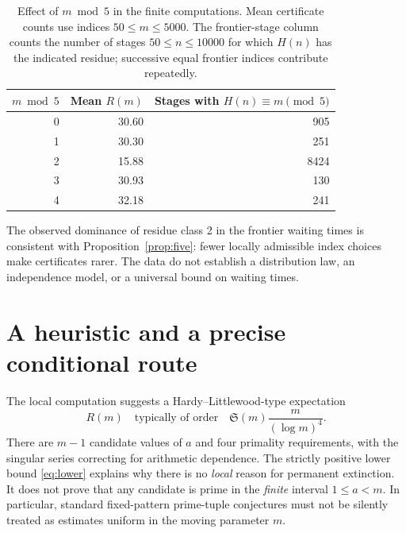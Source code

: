 \documentclass[11pt,a4paper]{article}
\numberwithin{equation}{section}
\theoremstyle{definition}
\newcommand{\SM}{\mathfrak{S}}
\begin{document}
\begin{table}[ht]
\centering
\caption{Effect of \(m\bmod5\) in the finite computations. Mean certificate counts use indices \(50\le m\le5000\). The frontier-stage column counts the number of stages \(50\le n\le10000\) for which \(H(n)\) has the indicated residue; successive equal frontier indices contribute repeatedly.}
\label{tab:five}
\begin{tabular}{rrr}
\toprule
\(m\bmod5\)&Mean \(R(m)\)&Stages with \(H(n)\equiv m\pmod5\)\\
\midrule
0&30.60&905\\
1&30.30&251\\
2&15.88&8424\\
3&30.93&130\\
4&32.18&241\\
\bottomrule
\end{tabular}
\end{table}

The observed dominance of residue class 2 in the frontier waiting times is consistent with Proposition~\ref{prop:five}: fewer locally admissible index choices make certificates rarer. The data do not establish a distribution law, an independence model, or a universal bound on waiting times.

\section{A heuristic and a precise conditional route}
The local computation suggests a Hardy--Littlewood-type expectation
\begin{equation}\label{eq:heuristic}
R(m)\quad\text{typically of order}\quad
\SM(m)\frac{m}{(\log m)^4}.
\end{equation}
There are \(m-1\) candidate values of \(a\) and four primality requirements, with the singular series correcting for arithmetic dependence. The strictly positive lower bound \eqref{eq:lower} explains why there is no \emph{local} reason for permanent extinction. It does not prove that any candidate is prime in the \emph{finite} interval \(1\le a<m\). In particular, standard fixed-pattern prime-tuple conjectures must not be silently treated as estimates uniform in the moving parameter \(m\).
\end{document}
